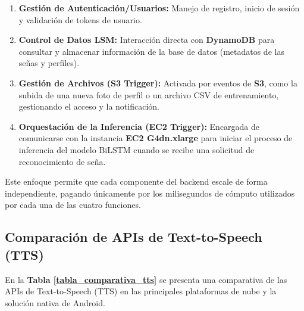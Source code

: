 \begin{enumerate}[label=\arabic*., nosep, itemsep=0pt]
    \item \textbf{Gestión de Autenticación/Usuarios:} Manejo de registro, inicio de sesión y validación de tokens de usuario.
    \item \textbf{Control de Datos LSM:} Interacción directa con \textbf{DynamoDB} para consultar y almacenar información de la base de datos (metadatos de las señas y perfiles).
    \item \textbf{Gestión de Archivos (S3 Trigger):} Activada por eventos de \textbf{S3}, como la subida de una nueva foto de perfil o un archivo CSV de entrenamiento, gestionando el acceso y la notificación.
    \item \textbf{Orquestación de la Inferencia (EC2 Trigger):} Encargada de comunicarse con la instancia \textbf{EC2 G4dn.xlarge} para iniciar el proceso de inferencia del modelo BiLSTM cuando se recibe una solicitud de reconocimiento de seña.
\end{enumerate}

Este enfoque permite que cada componente del backend escale de forma independiente, pagando únicamente por los milisegundos de cómputo utilizados por cada una de las cuatro funciones.

\subsection{Comparación de APIs de Text-to-Speech (TTS)}

En la \textbf{Tabla \ref{tabla_comparativa_tts}} se presenta una comparativa de las APIs de Text-to-Speech (TTS) en las principales plataformas de nube y la solución nativa de Android.

